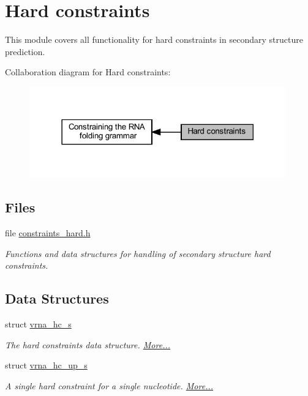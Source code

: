 \hypertarget{group__hard__constraints}{}\section{Hard constraints}
\label{group__hard__constraints}


This module covers all functionality for hard constraints in secondary structure prediction.  


Collaboration diagram for Hard constraints\+:
\nopagebreak
\begin{figure}[H]
\begin{center}
\leavevmode
\includegraphics[width=314pt]{group__hard__constraints}
\end{center}
\end{figure}
\subsection*{Files}
\begin{DoxyCompactItemize}
\item 
file \hyperlink{constraints__hard_8h}{constraints\+\_\+hard.\+h}
\begin{DoxyCompactList}\small\item\em Functions and data structures for handling of secondary structure hard constraints. \end{DoxyCompactList}\end{DoxyCompactItemize}
\subsection*{Data Structures}
\begin{DoxyCompactItemize}
\item 
struct \hyperlink{group__hard__constraints_structvrna__hc__s}{vrna\+\_\+hc\+\_\+s}
\begin{DoxyCompactList}\small\item\em The hard constraints data structure.  \hyperlink{group__hard__constraints_structvrna__hc__s}{More...}\end{DoxyCompactList}\item 
struct \hyperlink{group__hard__constraints_structvrna__hc__up__s}{vrna\+\_\+hc\+\_\+up\+\_\+s}
\begin{DoxyCompactList}\small\item\em A single hard constraint for a single nucleotide.  \hyperlink{group__hard__constraints_structvrna__hc__up__s}{More...}\end{DoxyCompactList}\end{DoxyCompactItemize}
